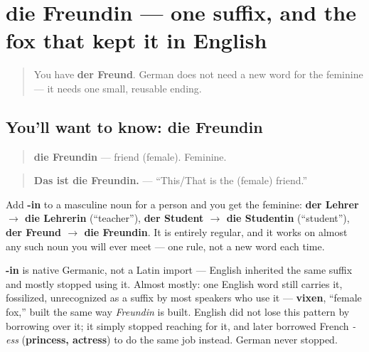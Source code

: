 \section[die Freundin]{die Freundin — one suffix, and the fox that kept it in English}

\label{lesson:GE-C29-freundin}



\begin{quote}
You have \textbf{der Freund}. German does not need a new word for the feminine — it needs one small, reusable ending.
\end{quote}

\subsection*{You'll want to know: die Freundin}
\begin{quote}
\textbf{die Freundin} — friend (female). Feminine.
\end{quote}

\begin{quote}
\textbf{Das ist die Freundin.} — \textquotedblleft{}This/That is the (female) friend.\textquotedblright{}
\end{quote}

\begin{grammarlens}[title={Grammar Lens: the ending that builds a whole class of nouns}]
Add \textbf{-in} to a masculine noun for a person and you get the feminine: \textbf{der Lehrer $\to$ die Lehrerin} (\textquotedblleft{}teacher\textquotedblright{}), \textbf{der Student $\to$ die Studentin} (\textquotedblleft{}student\textquotedblright{}), \textbf{der Freund $\to$ die Freundin}. It is entirely regular, and it works on almost any such noun you will ever meet — one rule, not a new word each time.
\end{grammarlens}

\begin{cousinweb}
\textbf{-in} is native Germanic, not a Latin import — English inherited the same suffix and mostly stopped using it. Almost mostly: one English word still carries it, fossilized, unrecognized as a suffix by most speakers who use it — \textbf{vixen}, \textquotedblleft{}female fox,\textquotedblright{} built the same way \emph{Freundin} is built. English did not lose this pattern by borrowing over it; it simply stopped reaching for it, and later borrowed French \emph{-ess} (\textbf{princess, actress}) to do the same job instead. German never stopped.
\end{cousinweb}

